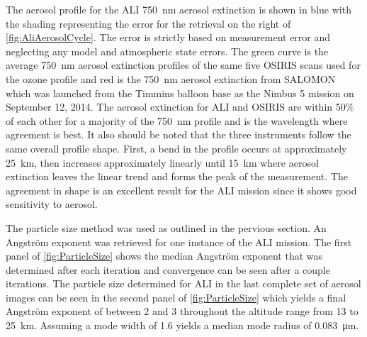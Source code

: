 \documentclass[12pt]{article}
\begin{document}

The aerosol profile for the ALI 750~nm aerosol extinction is shown in blue with the shading representing the error for the retrieval on the right of \autoref{fig:AliAerosolCycle}. The error is strictly based on measurement error and neglecting any model and atmospheric state errors. The green curve is the average 750~nm aerosol extinction profiles of the same five OSIRIS scans used for the ozone profile and red is the 750~nm aerosol extinction from SALOMON \citep{Berthet2002} which was launched from the Timmins balloon base as the Nimbus 5 mission on September 12, 2014. The aerosol extinction for ALI and OSIRIS are within 50\% of each other for a majority of the 750~nm profile and is the wavelength where agreement is best. It also should be noted that the three instruments follow the same overall profile shape.  First, a bend in the profile occurs at approximately 25~km, then increases approximately linearly until 15~km where aerosol extinction leaves the linear trend and forms the peak of the measurement. The agreement in shape is an excellent result for the ALI mission since it shows good sensitivity to aerosol.


The particle size method was used as outlined in the pervious section. An Angstr\"{o}m exponent was retrieved for one instance of the ALI mission. The first panel of \autoref{fig:ParticleSize} shows the median Angstr\"{o}m exponent that was determined after each iteration and convergence can be seen after a couple iterations. The particle size determined for ALI in the last complete set of aerosol images can be seen in the second panel of \autoref{fig:ParticleSize} which yields a final Angstr\"{o}m exponent of between 2 and 3 throughout the altitude range from 13 to 25~km. Assuming a mode width of 1.6 yields a median mode radius of 0.083~\si{\micro\metre}.
\end{document}
